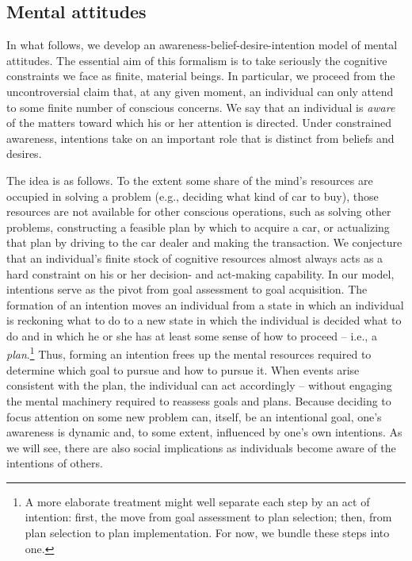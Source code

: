 \documentclass[
11pt,
titlepage,
reqno,
]{article}%
\theoremstyle{definition}
\begin{document}
	
	\subsection{Mental attitudes\label{sec:attitudes}}
	In what follows, we develop an awareness-belief-desire-intention model of mental attitudes. 
	The essential aim of this formalism is to take seriously the cognitive constraints we face as finite, material beings.
	In particular, we proceed from the uncontroversial claim that, at any given moment, an individual can only  attend to some finite number of conscious concerns. 
	We say that an individual is \textit{aware} of the matters toward which his or her attention is directed.
	Under constrained awareness, intentions take on an important role that is distinct from beliefs and desires.
	
	The idea is as follows.
	To the extent some share of the mind's resources are occupied in solving a problem (e.g., deciding what kind of car to buy), those resources are not available for other conscious operations, such as solving other problems, constructing a feasible plan by which to acquire a car, or actualizing that plan by driving to the car dealer and making the transaction.
	We conjecture that an individual's finite stock of cognitive resources almost always acts as a hard constraint on his or her decision- and act-making capability.
	In our model, intentions serve as the pivot from goal assessment to goal acquisition.
	The formation of an intention moves an individual from a state in which an individual is reckoning what to do to a new state in which the individual is decided what to do and in which he or she has at least some sense of how to proceed -- i.e., a \textit{plan}.\footnote
	{
		A more elaborate treatment might well separate each step by an act of intention: first, the move from goal assessment to plan selection; then, from plan selection to plan implementation. For now, we bundle these steps into one.
	}
	Thus, forming an intention frees up the mental resources required to determine which goal to pursue and how to pursue it.
	When events arise consistent with the plan, the individual can act accordingly -- without engaging the mental machinery required to reassess goals and plans.
	Because deciding to focus attention on some new problem can, itself, be an intentional goal, one's awareness is dynamic and, to some extent, influenced by one's own intentions.
	As we will see, there are also social implications as individuals become aware of the intentions of others.  
\end{document}
